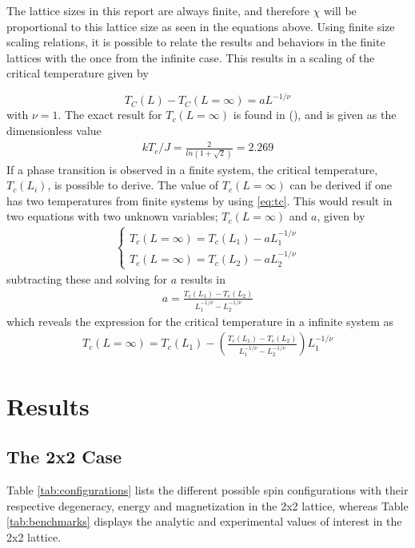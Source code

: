 \documentclass[12pt,english,a4paper]{article}
\begin{document}
\noindent The lattice sizes in this report are always finite, and therefore $\chi$ will be proportional to this lattice size as seen in the equations above. Using finite size scaling relations, it is possible to relate the results and behaviors in the finite lattices with the once from the infinite case. This results in a scaling of the critical temperature given by

\begin{equation}
    T_C(L)-T_C(L=\infty) = aL^{-1/\nu} \label{eq:tc}
\end{equation}
with $\nu = 1$. The exact result for $T_c(L=\infty)$ is found in (\cite{LarsOns}), and is given as the dimensionless value
\begin{align*}
    kT_c/J=\frac{2}{ln(1+\sqrt{2})}=2.269
\end{align*}
If a phase transition is observed in a finite system, the critical temperature, $T_{c}(L_i)$, is possible to derive. The value of $T_{c}(L=\infty)$ can be derived if one has two temperatures from finite systems by using \eqref{eq:tc}. This would result in two equations with two unknown variables; $T_c(L=\infty)$ and $a$, given by
\begin{align*}
    \begin{cases}
        T_c(L=\infty)=T_c(L_1)-aL_1^{-1/\nu}\\
        T_c(L=\infty)=T_c(L_2)-aL_2^{-1/\nu}
    \end{cases}
\end{align*}
subtracting these and solving for $a$ results in
\begin{align*}
    a=\frac{T_c(L_1)-T_c(L_2)}{L_1^{-1/\nu}-L_2^{-1/\nu}}
\end{align*}
which reveals the expression for the critical temperature in a infinite system as
\begin{align*}
    T_c(L=\infty)=T_c(L_1)-\left(\frac{T_c(L_1)-T_c(L_2)}{L_1^{-1/\nu}-L_2^{-1/\nu}}\right)L_1^{-1/\nu}
\end{align*}

\section{Results}

\subsection{The 2x2 Case}

Table \ref{tab:configurations} lists the different possible spin configurations with their respective degeneracy, energy and magnetization in the 2x2 lattice, whereas Table \ref{tab:benchmarks} displays the analytic and experimental values of interest in the 2x2 lattice.
\end{document}
